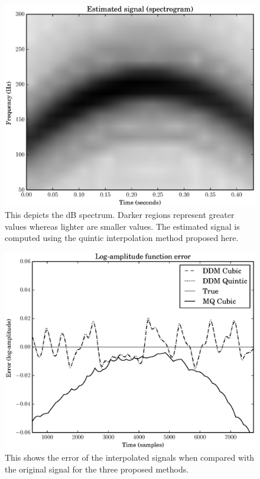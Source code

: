 \begin{figure}[!t]
    \centering
    \includegraphics[width=\figwidthscale\textwidth]{plots/mq_mod_quintic_estimated_spec.eps}
    \caption{This depicts the dB spectrum. Darker regions represent greater
        values whereas lighter are smaller values. The estimated signal is
        computed using the quintic interpolation method proposed here.
    \label{plot:mqmodcubicestimatedspec}}
\end{figure}

\begin{figure}[!t]
    \centering
    \includegraphics[width=\figwidthscale\textwidth]{plots/mq_mod_err_comp_logamp_err.eps}
    \caption{This shows the error of the interpolated signals when compared
    with the original signal for the three proposed methods.
    \label{plot:mqmoderrcomplogamperr}}
\end{figure}

